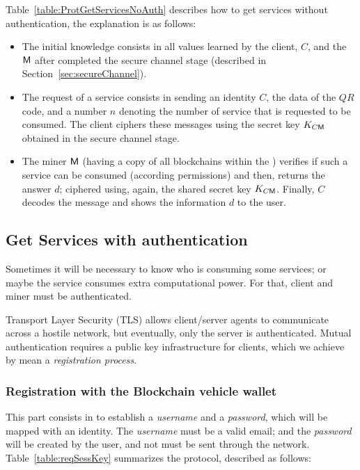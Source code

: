 Table~\ref{table:ProtGetServicesNoAuth} describes how to get services without authentication,
the explanation is as follows:
\begin{itemize}
  \item  The initial knowledge consists in all values learned by the client, $C$, and the 
    \blockchaincarnetwork~ $\textsf{M}$ after completed the secure channel stage 
    (described in Section~\ref{sec:secureChannel}).
   \item The request of a service consists in sending an identity $C$, the data of the $QR$ code, and a 
        number $n$ denoting the number of service that is requested to be consumed. 
        The client ciphers  these messages using the secret key $K_{C\textsf{M}}$ obtained in
        the secure channel stage. 
   \item The miner $\textsf{M}$ (having a copy of all blockchains within the \blockchaincarnetwork) verifies 
        if such a service can be consumed (according permissions) and then, 
        returns the answer $d$; ciphered using, again, the shared secret key $K_{C\textsf{M}}$. Finally,
        $C$ decodes the message and shows the information $d$ to the user.
\end{itemize}




\subsection{Get Services with authentication}
\label{ssec:ServAuth}
Sometimes it will be necessary to know who is consuming some services; or maybe the service consumes extra 
computational power. For that, client and miner must be authenticated. 

Transport Layer Security (TLS) allows client/server agents to communicate 
across a hostile network, but eventually, only the server is authenticated. 
Mutual authentication requires a public key infrastructure for clients, which
we achieve by mean a \textit{registration process}. 

\subsubsection{Registration with the Blockchain vehicle wallet}
\label{sec:Registration}

This part consists in to establish a \textit{username} and a \textit{password}, which will be mapped with an identity. 
The \textit{username} must be a valid email; and the \textit{password} will be created by the user, and not must be sent through the network. 
Table~\ref{table:reqSessKey} summarizes the protocol, described as follows: 

